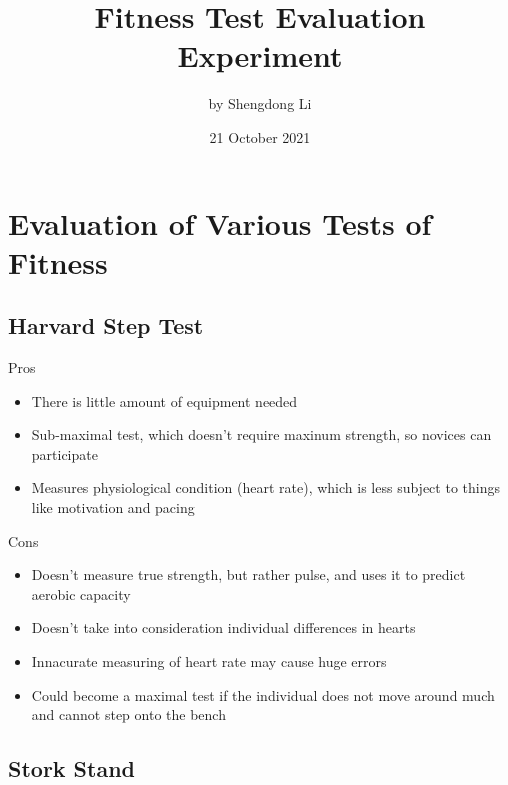\documentclass[12pt]{article}
\begin{document}
\title{Fitness Test Evaluation Experiment}
\author{by Shengdong Li}
\date{21 October 2021}
\maketitle

\section*{Evaluation of Various Tests of Fitness}

\subsection*{Harvard Step Test}

\begin{paracol}{2}
    \begin{center}Pros\end{center}
    \begin{itemize}
        \item There is little amount of equipment needed
        \item Sub-maximal test, which doesn't require maxinum strength, so novices can participate
        \item Measures physiological condition (heart rate), which is less subject to things like motivation and pacing
    \end{itemize}

    \switchcolumn

    \begin{center}Cons\end{center}
    \begin{itemize}
        \item Doesn't measure true strength, but rather pulse, and uses it to predict aerobic capacity
        \item Doesn't take into consideration individual differences in hearts
        \item Innacurate measuring of heart rate may cause huge errors
        \item Could become a maximal test if the individual does not move around much and cannot step onto the bench
    \end{itemize}
\end{paracol}

\subsection*{Stork Stand}
\end{document}
